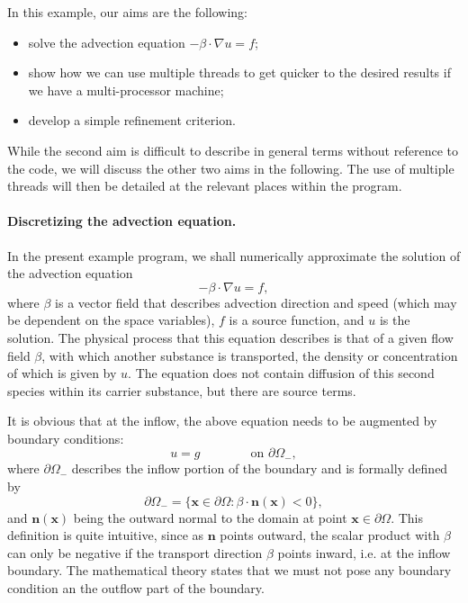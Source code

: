 \documentclass{article}
\renewcommand{\vec}[1]{{\mathbf #1}}
\begin{document}
In this example, our aims are the following:
\begin{itemize}
  \item solve the advection equation $-\beta \cdot \nabla u = f$;
  \item show how we can use multiple threads to get quicker to
    the desired results if we have a multi-processor machine;
  \item develop a simple refinement criterion.
\end{itemize}
While the second aim is difficult to describe in general terms without
reference to the code, we will discuss the other two aims in the
following. The use of multiple threads will then be detailed at the
relevant places within the program.

\paragraph{Discretizing the advection equation.}
In the present example program, we shall numerically approximate the
solution of the advection equation
$$
  -\beta \cdot \nabla u = f,
$$
where $\beta$ is a vector field that describes advection direction and
speed (which may be dependent on the space variables), $f$ is a source
function, and $u$ is the solution. The physical process that this
equation describes is that of a given flow field $\beta$, with which
another substance is transported, the density or concentration of
which is given by $u$. The equation does not contain diffusion of this
second species within its carrier substance, but there are source
terms.

It is obvious that at the inflow, the above equation needs to be
augmented by boundary conditions:
$$
  u = g \qquad\qquad \text{on $\partial\Omega_-$},
$$
where $\partial\Omega_-$ describes the inflow portion of the boundary and is
formally defined by
$$
  \partial\Omega_- 
  =
  \{\vec x\in \partial\Omega: \beta\cdot\vec n(\vec x) < 0\},
$$
and $\vec n(\vec x)$ being the outward normal to the domain at point
$\vec x\in\partial\Omega$. This definition is quite intuitive, since
as $\vec n$ points outward, the scalar product with $\beta$ can only
be negative if the transport direction $\beta$ points inward, i.e. at
the inflow boundary. The mathematical theory states that we must not
pose any boundary condition an the outflow part of the boundary.
\end{document}
